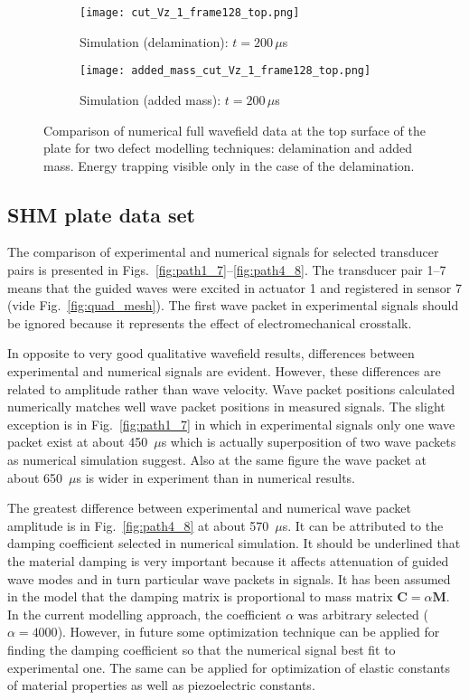 \documentclass[preprint,12pt]{elsarticle}
\renewcommand{\bm}[1]{\mathbf{#1}}
\begin{document}
	\begin{figure} [h!]
		\begin{subfigure}[b]{0.49\textwidth}
			\centering
			\texttt{[image: cut\_Vz\_1\_frame128\_top.png]} 
			\caption{Simulation (delamination): $t=200\,  \mu$s}
			\label{fig:num_frame128_top}
		\end{subfigure}
		\hfill
		\begin{subfigure}[b]{0.49\textwidth}
			\centering
			\texttt{[image: added\_mass\_cut\_Vz\_1\_frame128\_top.png]}
			\caption{Simulation (added mass): $t=200\, \mu$s}
			\label{fig:num_frame128_added_mass_top}
		\end{subfigure}
		\caption{Comparison of numerical full wavefield data at the top surface of the plate for two defect modelling techniques: delamination and added mass. Energy trapping visible only in the case of the delamination.} 
		\label{fig:wave_entrapment}
	\end{figure}
\clearpage
\subsection{SHM plate data set}
The comparison of experimental and numerical signals for selected transducer pairs is presented in Figs.~\ref{fig:path1_7}--\ref{fig:path4_8}. The transducer pair 1--7 means that the guided waves were excited in actuator 1 and registered in sensor 7 (vide Fig.~\ref{fig:quad_mesh}). The first wave packet in experimental signals should be ignored because it represents the effect of electromechanical crosstalk.

In opposite to very good qualitative wavefield results, differences between experimental and numerical signals are evident. However, these differences are related to amplitude rather than wave velocity. Wave packet positions calculated numerically matches well wave packet positions in measured signals. The slight exception is in Fig.~\ref{fig:path1_7} in which in experimental signals only one wave packet exist at about 450~$\mu$s which is actually superposition of two wave packets as numerical simulation suggest. Also at the same figure the wave packet at about 650~$\mu$s is wider in experiment than in numerical results. 

The greatest difference between experimental and numerical wave packet amplitude is in Fig.~\ref{fig:path4_8} at about 570~$\mu$s. It can be attributed to the damping coefficient selected in numerical simulation. It should be underlined that the material damping is very important because it affects attenuation of guided wave modes and in turn particular wave packets in signals. It has been assumed in the model that the damping matrix is proportional to mass matrix $\bm{C} = \alpha \bm{M}$. In the current modelling approach, the coefficient $\alpha$ was arbitrary selected ($\alpha = 4000$). However, in future some optimization technique can be applied for finding the damping coefficient so that the numerical signal best fit to experimental one. The same can be applied for optimization of elastic constants of material properties as well as piezoelectric constants. 
\end{document}
